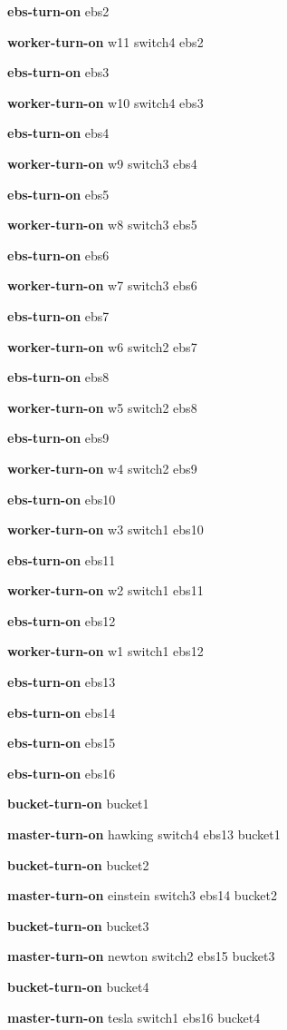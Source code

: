 \documentclass[letterpaper]{article}
\begin{document}
\textbf{ebs-turn-on} ebs2 

\textbf{worker-turn-on} w11 switch4 ebs2 

\textbf{ebs-turn-on} ebs3 

\textbf{worker-turn-on} w10 switch4 ebs3 

\textbf{ebs-turn-on} ebs4 

\textbf{worker-turn-on} w9 switch3 ebs4 

\textbf{ebs-turn-on} ebs5 

\textbf{worker-turn-on} w8 switch3 ebs5 

\textbf{ebs-turn-on} ebs6 

\textbf{worker-turn-on} w7 switch3 ebs6 

\textbf{ebs-turn-on} ebs7 

\textbf{worker-turn-on} w6 switch2 ebs7 

\textbf{ebs-turn-on} ebs8 

\textbf{worker-turn-on} w5 switch2 ebs8 

\textbf{ebs-turn-on} ebs9 

\textbf{worker-turn-on} w4 switch2 ebs9 

\textbf{ebs-turn-on} ebs10 

\textbf{worker-turn-on} w3 switch1 ebs10 

\textbf{ebs-turn-on} ebs11 

\textbf{worker-turn-on} w2 switch1 ebs11 

\textbf{ebs-turn-on} ebs12 

\textbf{worker-turn-on} w1 switch1 ebs12 

\textbf{ebs-turn-on} ebs13 

\textbf{ebs-turn-on} ebs14 

\textbf{ebs-turn-on} ebs15 

\textbf{ebs-turn-on} ebs16 

\textbf{bucket-turn-on} bucket1 

\textbf{master-turn-on} hawking switch4 ebs13 bucket1 

\textbf{bucket-turn-on} bucket2 

\textbf{master-turn-on} einstein switch3 ebs14 bucket2 

\textbf{bucket-turn-on} bucket3 

\textbf{master-turn-on} newton switch2 ebs15 bucket3 

\textbf{bucket-turn-on} bucket4 

\textbf{master-turn-on} tesla switch1 ebs16 bucket4
\end{document}
